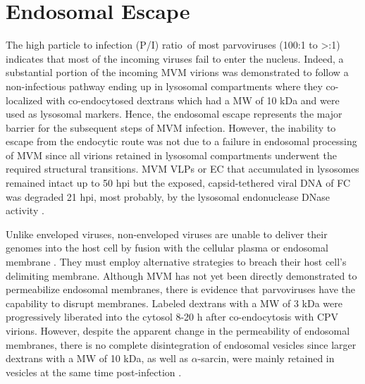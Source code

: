 
\section{Endosomal Escape}
\label{Escape}
The high particle to infection (P/I) ratio\footnotemark~of most parvoviruses (100:1 to >:1) \cite{pmid4673484, pmid20649475, pmid7288919} indicates that most of the incoming viruses fail to enter the nucleus. Indeed, a substantial portion of the incoming MVM virions was demonstrated to follow a non-infectious pathway ending up in lysosomal compartments where they co-localized with co-endocytosed dextrans which had a MW of 10 kDa and were used as lysosomal markers. Hence, the endosomal escape represents the major barrier for the subsequent steps of MVM infection. However, the inability to escape from the endocytic route was not due to a failure in endosomal processing of MVM since all virions retained in lysosomal compartments underwent the required structural transitions. MVM VLPs or EC that accumulated in lysosomes remained intact up to 50 hpi but the exposed, capsid-tethered viral DNA of FC was degraded 21 hpi, most probably, by the lysosomal endonuclease DNase~ activity \cite{pmid16379002}. 

Unlike enveloped viruses, non-enveloped viruses are unable to deliver their genomes into the host cell by fusion with the cellular plasma or endosomal membrane \cite{pmid18596815}. They must employ alternative strategies to breach their host cell's delimiting membrane. Although MVM has not yet been directly demonstrated to permeabilize endosomal membranes, there is evidence that parvoviruses have the capability to disrupt membranes. Labeled dextrans with a MW of 3 kDa were progressively liberated into the cytosol 8-20 h after co-endocytosis with CPV virions. However, despite the apparent change in the permeability of endosomal membranes, there is no complete disintegration of endosomal vesicles since larger dextrans with a MW of 10 kDa, as well as $\alpha$-sarcin, were mainly retained in vesicles at the same time post-infection \cite{pmid14644609, pmid10644365}.

